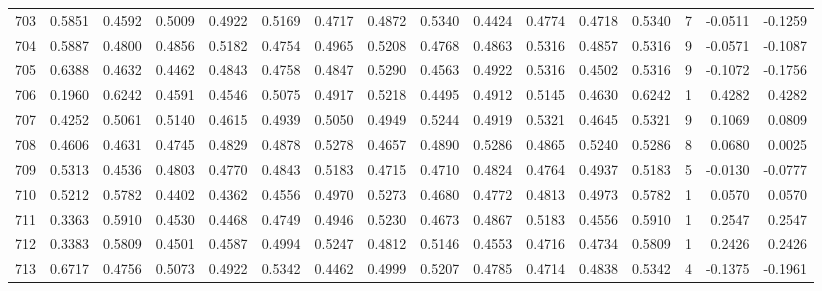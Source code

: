 \begin{tabular}{lrrrrrrrrrrrrrrr}
703 &      0.5851 &  0.4592 &  0.5009 &  0.4922 &  0.5169 &  0.4717 &  0.4872 &  0.5340 &  0.4424 &  0.4774 &   0.4718 &     0.5340 &      7 &                   -0.0511 &                    -0.1259 \\
704 &      0.5887 &  0.4800 &  0.4856 &  0.5182 &  0.4754 &  0.4965 &  0.5208 &  0.4768 &  0.4863 &  0.5316 &   0.4857 &     0.5316 &      9 &                   -0.0571 &                    -0.1087 \\
705 &      0.6388 &  0.4632 &  0.4462 &  0.4843 &  0.4758 &  0.4847 &  0.5290 &  0.4563 &  0.4922 &  0.5316 &   0.4502 &     0.5316 &      9 &                   -0.1072 &                    -0.1756 \\
706 &      0.1960 &  0.6242 &  0.4591 &  0.4546 &  0.5075 &  0.4917 &  0.5218 &  0.4495 &  0.4912 &  0.5145 &   0.4630 &     0.6242 &      1 &                    0.4282 &                     0.4282 \\
707 &      0.4252 &  0.5061 &  0.5140 &  0.4615 &  0.4939 &  0.5050 &  0.4949 &  0.5244 &  0.4919 &  0.5321 &   0.4645 &     0.5321 &      9 &                    0.1069 &                     0.0809 \\
708 &      0.4606 &  0.4631 &  0.4745 &  0.4829 &  0.4878 &  0.5278 &  0.4657 &  0.4890 &  0.5286 &  0.4865 &   0.5240 &     0.5286 &      8 &                    0.0680 &                     0.0025 \\
709 &      0.5313 &  0.4536 &  0.4803 &  0.4770 &  0.4843 &  0.5183 &  0.4715 &  0.4710 &  0.4824 &  0.4764 &   0.4937 &     0.5183 &      5 &                   -0.0130 &                    -0.0777 \\
710 &      0.5212 &  0.5782 &  0.4402 &  0.4362 &  0.4556 &  0.4970 &  0.5273 &  0.4680 &  0.4772 &  0.4813 &   0.4973 &     0.5782 &      1 &                    0.0570 &                     0.0570 \\
711 &      0.3363 &  0.5910 &  0.4530 &  0.4468 &  0.4749 &  0.4946 &  0.5230 &  0.4673 &  0.4867 &  0.5183 &   0.4556 &     0.5910 &      1 &                    0.2547 &                     0.2547 \\
712 &      0.3383 &  0.5809 &  0.4501 &  0.4587 &  0.4994 &  0.5247 &  0.4812 &  0.5146 &  0.4553 &  0.4716 &   0.4734 &     0.5809 &      1 &                    0.2426 &                     0.2426 \\
713 &      0.6717 &  0.4756 &  0.5073 &  0.4922 &  0.5342 &  0.4462 &  0.4999 &  0.5207 &  0.4785 &  0.4714 &   0.4838 &     0.5342 &      4 &                   -0.1375 &                    -0.1961 \\

\end{tabular}
